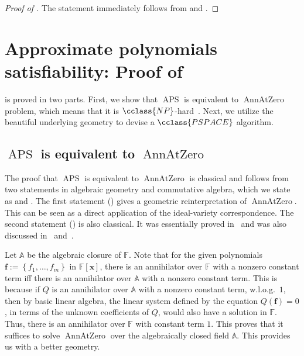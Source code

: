 \documentclass{toc}
\newcommand{\F}{\mathbb{F}}
\newcommand{\aff}{\mathbb{A}}
\newcommand{\inbrace }[1]{\left\{#1\right\}}
\newcommand{\NP}{\cclass{NP}\xspace}  %
\newcommand{\PSPACE}{\cclass{PSPACE}\xspace}  %
\DeclareMathOperator{\APS}{\mathrm{APS}\xspace} %
\DeclareMathOperator{\AnnAtZero}{\mathrm{AnnAtZero}\xspace} %
\begin{document}
\begin{proof}[Proof of ]
The statement immediately follows from  and .
\end{proof}


%
\section{Approximate polynomials satisfiability: Proof of } \label{sec:aps}
%

 is proved in two parts. First, we show that $\APS$ is equivalent to $\AnnAtZero$ 
%
problem, %
which means that it is $\NP$-hard~\cite{Kay09}. Next, we utilize the  beautiful underlying geometry to devise a $\PSPACE$ algorithm.


\subsection{\texorpdfstring{$\APS$}{APS} is equivalent to \texorpdfstring{$\AnnAtZero$}{AnnAtZero}}

The proof that $\APS$ is equivalent to $\AnnAtZero$ is classical and follows from two statements in algebraic geometry and commutative algebra, which we state as  and .
The first statement () gives a geometric reinterpretation of $\AnnAtZero$. This can be seen as a direct application of the ideal-variety correspondence. 
The second statement ()  is also classical. It was essentially proved in~\cite{LL89} and was also discussed in~\cite[Lemma~20.28]{burgisser2013algebraic} and~\cite[Page~37:53]{grochow2018circuit}.

%

Let $\aff$ be the algebraic closure of $\F$. Note that for the given polynomials $\mathbf f:= \inbrace{f_1,\dots,f_m}$ in $\F[\mathbf x]$, there is an annihilator over $\F$ with 
%
a nonzero %
constant term iff there is an annihilator over $\aff$ with 
%
a nonzero %
constant term. This is because if $Q$ is an annihilator over $\aff$ with 
%
a nonzero %
constant term, w.l.o.g.\ $1$, then by basic linear algebra, the linear system defined by the equation $Q(\mathbf f)=0$, in terms of the unknown coefficients of $Q$, would also have a solution in $\F$. Thus, there is an annihilator over $\F$ with constant term $1$. This proves that it suffices to solve $\AnnAtZero$ over the algebraically closed field $\aff$. This provides us with a better geometry. 
\end{document}
